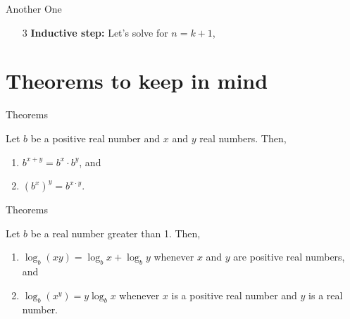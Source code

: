 \documentclass[aspectratio=169]{beamer}
\renewcommand{\qed}{\\ \hfill $\blacksquare$}
\begin{document}
\begin{frame}{Another One}
    \begin{enumerate}
        \item[3] \textbf{Inductive step:} Let's solve for $n = k + 1$,
        { \scriptsize
            \uncover<+->{$$ (k + 1) \cdot (k + 2) \cdot (2k + 3) = (k + 1) \cdot (k + 2) \cdot (2k + 3) $$ \qed }
        }
    \end{enumerate}
\end{frame}

\section{Theorems to keep in mind}

\begin{frame}{Theorems}
    \begin{theorem}\label{theo:one}
        Let $b$ be a positive real number and $x$ and $y$ real numbers. Then,
        \begin{enumerate}
         \item $b^{x+y} = b^x \cdot b^y$, and
         \item $(b^x)^y = b^{x \cdot y}$.
        \end{enumerate}
    \end{theorem}

\end{frame}

\begin{frame}{Theorems}
    \begin{theorem}\label{theo:two}
        Let $b$ be a real number greater than 1. Then,
        \begin{enumerate}
         \item $\log_b (xy) = \log_b x + \log_b y$ whenever $x$ and $y$ are positive real numbers, and
         \item $\log_b (x^y) = y \log_b x$ whenever $x$ is a positive real number and $y$ is a real number.
        \end{enumerate}
    \end{theorem}
\end{frame}
\end{document}

